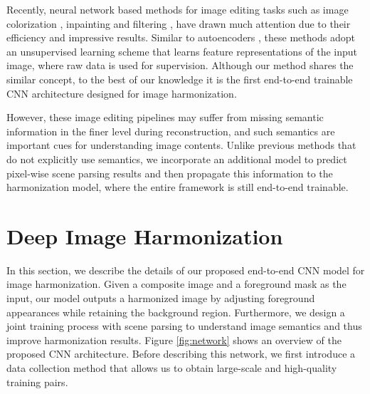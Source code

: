 \documentclass[10pt,twocolumn,letterpaper]{article}
\begin{document}
{}
%
Recently, neural network based methods for image editing tasks such as image colorization \cite{Iizuka_SIGGRAPH_2016, Larsson_ECCV_2016, Zhang_ECCV_2016}, inpainting \cite{Pathak_CVPR_2016} and filtering \cite{Liu_ECCV_2016}, have drawn much 
attention due to their efficiency and impressive results.
%
Similar to autoencoders \cite{Bengio_PAMI_2013}, these methods adopt an unsupervised learning scheme that learns feature representations of the input image, where raw data 
is used for supervision.
%
Although our method shares the similar concept, to the best of our knowledge
it is the first end-to-end trainable CNN architecture designed for image harmonization.
%

However, these image editing pipelines may suffer from missing semantic information in the finer level during reconstruction, and such semantics are important cues for understanding image contents.
%
Unlike previous methods that do not explicitly use semantics, we incorporate an additional model to predict pixel-wise scene parsing results and then propagate this information to the harmonization model, where the entire framework is still end-to-end trainable.
%
\section{Deep Image Harmonization}
%
In this section, we describe the details of our proposed end-to-end CNN model for image harmonization.
%
Given a composite image and a foreground mask as the input, our model outputs a harmonized image by adjusting foreground appearances while retaining the background region.
%
Furthermore, we design a joint training process with scene parsing to understand image semantics and thus improve harmonization results.
%
Figure \ref{fig:network} shows an overview of the proposed CNN architecture. 
%
Before describing this network, we first introduce a data collection method that allows us to obtain large-scale and high-quality training pairs.
%
\end{document}
